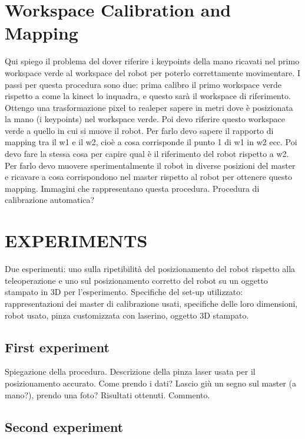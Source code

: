 \documentclass[letterpaper, 10 pt, conference]{ieeeconf}  %
\begin{document}
\section{Workspace Calibration and Mapping}

Qui spiego il problema del dover riferire i keypoints della mano ricavati nel primo workspace verde al workspace del robot per poterlo correttamente movimentare. I passi per questa procedura sono due: prima calibro il primo workspace verde rispetto a come la kinect lo inquadra, e questo sarà il workspace di riferimento. Ottengo una trasformazione pixel to realeper sapere in metri dove è posizionata la mano (i keypoints) nel workspace verde.
Poi devo riferire questo workspace verde a quello in cui si muove il robot. Per farlo devo sapere il rapporto di mapping tra il w1 e il w2, cioè a cosa corrisponde il punto 1 di w1 in w2 ecc. Poi devo fare la stessa cosa per capire qual è il riferimento del robot rispetto a w2. Per farlo devo muovere sperimentalmente il robot in diverse posizioni del master e ricavare a cosa corrispondono nel master rispetto al robot per ottenere questo mapping.
Immagini che rappresentano questa procedura.
Procedura di calibrazione automatica?

\section{EXPERIMENTS}\label{sec:experiments}

Due esperimenti: uno sulla ripetibilità del posizionamento del robot rispetto alla teleoperazione e uno sul posizionamento corretto del robot su un oggetto stampato in 3D per l'esperimento.
Specifiche del set-up utilizzato: rappresentazioni dei master di calibrazione usati, specifiche delle loro dimensioni, robot usato, pinza customizzata con laserino, oggetto 3D stampato.

\subsection{First experiment}

Spiegazione della procedura. Descrizione della pinza laser usata per il posizionamento accurato. Come prendo i dati? Lascio giù un segno sul master (a mano?), prendo una foto?
Risultati ottenuti.
Commento.

\subsection{Second experiment}
\end{document}
